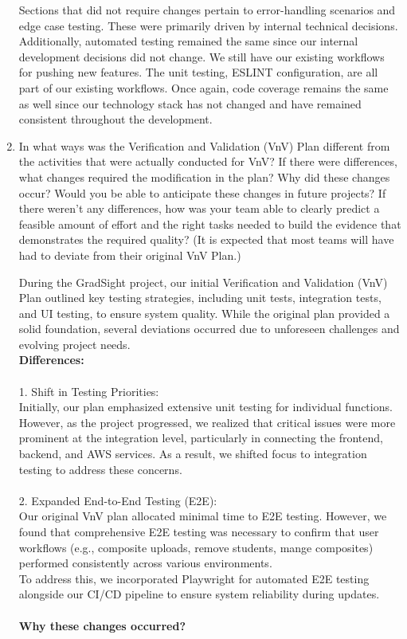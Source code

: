 \documentclass[12pt, titlepage]{article}
\begin{document}
\begin{enumerate}
Sections that did not require changes pertain to error-handling scenarios and edge case testing. These were primarily driven by internal technical decisions.
Additionally, automated testing remained the same since our internal development decisions did not change. We still have our existing workflows for pushing new features. The unit testing, ESLINT configuration, are all part of our existing workflows.
Once again, code coverage remains the same as well since our technology stack has not changed and have remained consistent throughout the development.

  \item In what ways was the Verification and Validation (VnV) Plan different
  from the activities that were actually conducted for VnV?  If there were
  differences, what changes required the modification in the plan?  Why did
  these changes occur?  Would you be able to anticipate these changes in future
  projects?  If there weren't any differences, how was your team able to clearly
  predict a feasible amount of effort and the right tasks needed to build the
  evidence that demonstrates the required quality?  (It is expected that most
  teams will have had to deviate from their original VnV Plan.)

  During the GradSight project, our initial Verification and Validation (VnV) Plan outlined key testing strategies, including unit tests, integration tests, and UI testing, to ensure system quality. While the original plan provided a solid foundation, several deviations occurred due to unforeseen challenges and evolving project needs. \\

 \textbf{Differences:} \\
\\1. Shift in Testing Priorities: \\
Initially, our plan emphasized extensive unit testing for individual functions. However, as the project progressed, we realized that critical issues were more prominent at the integration level, particularly in connecting the frontend, backend, and AWS services. As a result, we shifted focus to integration testing to address these concerns. \\
\\2. Expanded End-to-End Testing (E2E):  \\
Our original VnV plan allocated minimal time to E2E testing. However, we found that comprehensive E2E testing was necessary to confirm that user workflows (e.g., composite uploads, remove students, mange composites) performed consistently across various environments.\\
To address this, we incorporated Playwright for automated E2E testing alongside our CI/CD pipeline to ensure system reliability during updates.\\
\\ \textbf{Why these changes occurred?}\\


\end{enumerate}
\end{document}
